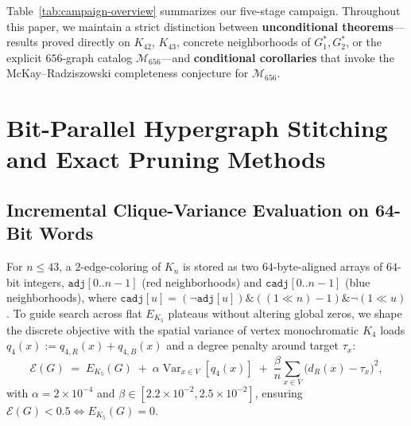 \documentclass[11pt,a4paper]{article}
\theoremstyle{plain}
\theoremstyle{definition}
\DeclareMathOperator{\Var}{Var}
\begin{document}
Table~\ref{tab:campaign-overview} summarizes our five-stage campaign. Throughout this paper, we maintain a strict distinction between \textbf{unconditional theorems}---results proved directly on $K_{42}$, $K_{43}$, concrete neighborhoods of $G^*_1, G^*_2$, or the explicit $656$-graph catalog $\mathcal{M}_{656}$---and \textbf{conditional corollaries} that invoke the McKay--Radziszowski completeness conjecture for $\mathcal{M}_{656}$.

\section{Bit-Parallel Hypergraph Stitching and Exact Pruning Methods}
\label{sec:methods}

\subsection{Incremental Clique-Variance Evaluation on 64-Bit Words}

For $n \le 43$, a $2$-edge-coloring of $K_n$ is stored as two $64$-byte-aligned arrays of $64$-bit integers, $\mathtt{adj}[0..n-1]$ (red neighborhoods) and $\mathtt{cadj}[0..n-1]$ (blue neighborhoods), where $\mathtt{cadj}[u] = (\neg \mathtt{adj}[u]) \mathbin{\&} ((1 \ll n) - 1) \mathbin{\&} \neg(1 \ll u)$. To guide search across flat $E_{K_5}$ plateaus without altering global zeros, we shape the discrete objective with the spatial variance of vertex monochromatic $K_4$ loads $q_4(x) := q_{4,R}(x) + q_{4,B}(x)$ and a degree penalty around target $\tau_x$:
\begin{equation}\label{eq:shaped-energy}
  \mathcal{E}(G) \;=\; E_{K_5}(G) \;+\; \alpha \Var_{x \in V}[q_4(x)] \;+\; \frac{\beta}{n}\sum_{x \in V}\bigl(d_R(x) - \tau_x\bigr)^2,
\end{equation}
with $\alpha = 2 \times 10^{-4}$ and $\beta \in [2.2 \times 10^{-2}, 2.5 \times 10^{-2}]$, ensuring $\mathcal{E}(G) < 0.5 \iff E_{K_5}(G) = 0$.
\end{document}
